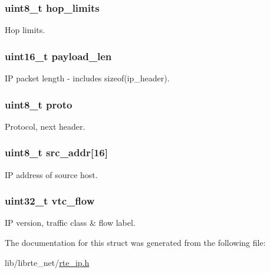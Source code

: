 \subsubsection[{hop\+\_\+limits}]{\setlength{\rightskip}{0pt plus 5cm}uint8\+\_\+t hop\+\_\+limits}\label{structipv6__hdr_a00877d99c569e5b16e1d7141e7354536}
Hop limits. \hypertarget{structipv6__hdr_a275f869dbba91f4716540a49b6c22532}{}
\subsubsection[{payload\+\_\+len}]{\setlength{\rightskip}{0pt plus 5cm}uint16\+\_\+t payload\+\_\+len}\label{structipv6__hdr_a275f869dbba91f4716540a49b6c22532}
I\+P packet length -\/ includes sizeof(ip\+\_\+header). \hypertarget{structipv6__hdr_adaae928b69788f774db092e75f1c4fb7}{}
\subsubsection[{proto}]{\setlength{\rightskip}{0pt plus 5cm}uint8\+\_\+t proto}\label{structipv6__hdr_adaae928b69788f774db092e75f1c4fb7}
Protocol, next header. \hypertarget{structipv6__hdr_a6986cf27ec82df0bdd16f9d574a9a009}{}
\subsubsection[{src\+\_\+addr}]{\setlength{\rightskip}{0pt plus 5cm}uint8\+\_\+t src\+\_\+addr\mbox{[}16\mbox{]}}\label{structipv6__hdr_a6986cf27ec82df0bdd16f9d574a9a009}
I\+P address of source host. \hypertarget{structipv6__hdr_acdbd04b4952ce247bad761255dab2ff5}{}
\subsubsection[{vtc\+\_\+flow}]{\setlength{\rightskip}{0pt plus 5cm}uint32\+\_\+t vtc\+\_\+flow}\label{structipv6__hdr_acdbd04b4952ce247bad761255dab2ff5}
I\+P version, traffic class \& flow label. 

The documentation for this struct was generated from the following file\+:\begin{DoxyCompactItemize}
\item 
lib/librte\+\_\+net/\hyperlink{rte__ip_8h}{rte\+\_\+ip.\+h}\end{DoxyCompactItemize}
